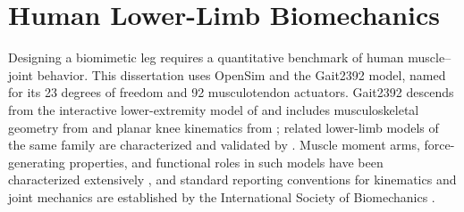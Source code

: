 \section{Human Lower-Limb Biomechanics}\label{sec:bg_biomechanics}

Designing a biomimetic leg requires a quantitative benchmark of human muscle--joint behavior. This dissertation uses OpenSim \citep{delp_opensim_2007, seth_opensim_2011, seth_opensim_2018} and the Gait2392 model, named for its 23 degrees of freedom and 92 musculotendon actuators. Gait2392 descends from the interactive lower-extremity model of \citet{delp_interactive_1990} and includes musculoskeletal geometry from \citet{hoy_musculoskeletal_1990} and planar knee kinematics from \citet{yamaguchi_planar_1989}; related lower-limb models of the same family are characterized and validated by \citet{arnold_model_2010}. Muscle moment arms, force-generating properties, and functional roles in such models have been characterized extensively \citep{zajac_determining_1989, brand_model_1982, menegaldo_moment_2004, millard_flexing_2013, sherman_what_2013, suderman_moving_2012}, and standard reporting conventions for kinematics and joint mechanics are established by the International Society of Biomechanics \citep{wu_for_1995, wu_isb_2002, wu_isb_2005, derrick_isb_2020}.

